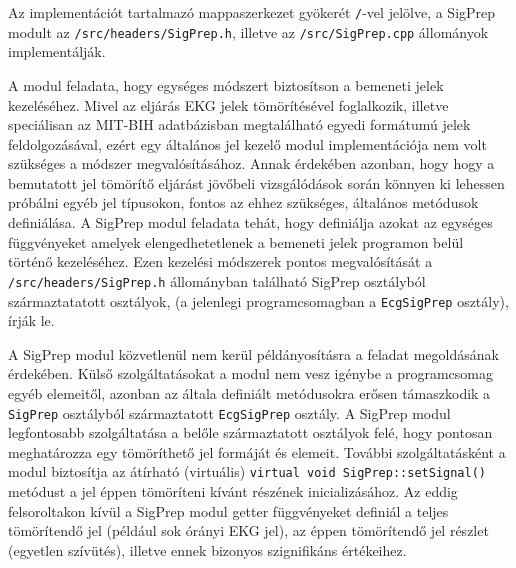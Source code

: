 \documentclass[oneside,titlepage,12pt,a4paper]{report}
\begin{document}
Az implementációt tartalmazó mappaszerkezet gyökerét \texttt{/}-vel jelölve, a SigPrep modult  az \texttt{/src/headers/SigPrep.h}, illetve az \texttt{/src/SigPrep.cpp} állományok implementálják. \par A modul feladata, hogy egységes módszert biztosítson a bemeneti jelek kezeléséhez. 
Mivel az eljárás EKG jelek tömörítésével foglalkozik, illetve speciálisan az MIT-BIH adatbázisban megtalálható egyedi formátumú jelek feldolgozásával, 
ezért egy általános jel kezelő modul implementációja nem volt szükséges a módszer megvalósításához. Annak érdekében azonban, hogy 
hogy a bemutatott jel tömörítő eljárást jövőbeli vizsgálódások során könnyen ki lehessen próbálni egyéb jel típusokon, fontos az ehhez szükséges, általános metódusok definiálása. A SigPrep modul feladata tehát, hogy definiálja azokat az egységes függvényeket amelyek elengedhetetlenek a bemeneti jelek programon belül történő kezeléséhez. Ezen kezelési módszerek pontos megvalósítását a \texttt{/src/headers/SigPrep.h} állományban található SigPrep osztályból származtatatott osztályok, (a jelenlegi programcsomagban a \texttt{EcgSigPrep} osztály), írják le. 
\par A SigPrep modul közvetlenül nem kerül példányosításra a feladat megoldásának érdekében. Külső szolgáltatásokat a modul nem vesz igénybe a programcsomag egyéb elemeitől, azonban az általa definiált metódusokra erősen támaszkodik a \texttt{SigPrep} osztályból származtatott \texttt{EcgSigPrep} osztály. A SigPrep modul legfontosabb szolgáltatása a belőle származtatott osztályok felé, hogy pontosan meghatározza egy tömöríthető jel formáját és elemeit. További szolgáltatásként a modul biztosítja az átírható (virtuális) \texttt{virtual void SigPrep::setSignal()} metódust a jel éppen tömöríteni kívánt részének inicializásához. Az eddig felsoroltakon kívül a SigPrep modul getter függvényeket definiál a teljes tömörítendő jel (például sok órányi EKG jel), az éppen tömörítendő jel részlet (egyetlen szívütés), illetve ennek bizonyos szignifikáns értékeihez. 
\end{document}

